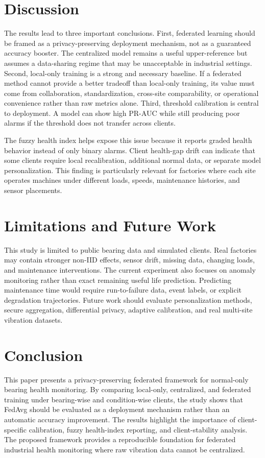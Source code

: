 \documentclass[11pt]{article}
\begin{document}


\section{Discussion}

The results lead to three important conclusions. First, federated learning should be framed as a privacy-preserving deployment mechanism, not as a guaranteed accuracy booster. The centralized model remains a useful upper-reference but assumes a data-sharing regime that may be unacceptable in industrial settings. Second, local-only training is a strong and necessary baseline. If a federated method cannot provide a better tradeoff than local-only training, its value must come from collaboration, standardization, cross-site comparability, or operational convenience rather than raw metrics alone. Third, threshold calibration is central to deployment. A model can show high PR-AUC while still producing poor alarms if the threshold does not transfer across clients.

The fuzzy health index helps expose this issue because it reports graded health behavior instead of only binary alarms. Client health-gap drift can indicate that some clients require local recalibration, additional normal data, or separate model personalization. This finding is particularly relevant for factories where each site operates machines under different loads, speeds, maintenance histories, and sensor placements.

\section{Limitations and Future Work}

This study is limited to public bearing data and simulated clients. Real factories may contain stronger non-IID effects, sensor drift, missing data, changing loads, and maintenance interventions. The current experiment also focuses on anomaly monitoring rather than exact remaining useful life prediction. Predicting maintenance time would require run-to-failure data, event labels, or explicit degradation trajectories. Future work should evaluate personalization methods, secure aggregation, differential privacy, adaptive calibration, and real multi-site vibration datasets.

\section{Conclusion}

This paper presents a privacy-preserving federated framework for normal-only bearing health monitoring. By comparing local-only, centralized, and federated training under bearing-wise and condition-wise clients, the study shows that FedAvg should be evaluated as a deployment mechanism rather than an automatic accuracy improvement. The results highlight the importance of client-specific calibration, fuzzy health-index reporting, and client-stability analysis. The proposed framework provides a reproducible foundation for federated industrial health monitoring where raw vibration data cannot be centralized.



\end{document}
